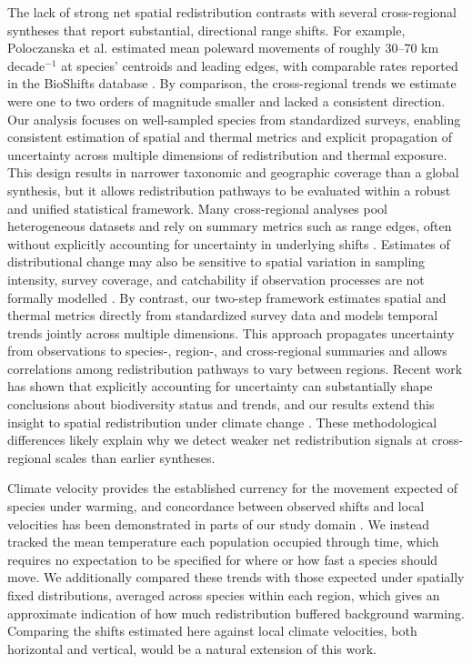 \documentclass[9pt,twocolumn,twoside]{pnas-new}
\begin{document}
The lack of strong net spatial redistribution contrasts with several cross-regional syntheses that report substantial, directional range shifts. For example, Poloczanska et al. \citep{poloczanska_global_2013} estimated mean poleward movements of roughly 30--70 km decade$^{-1}$ at species' centroids and leading edges, with comparable rates reported in the BioShifts database \citep{lenoir_species_2020}. By comparison, the cross-regional trends we estimate were one to two orders of magnitude smaller and lacked a consistent direction. Our analysis focuses on well-sampled species from standardized surveys, enabling consistent estimation of spatial and thermal metrics and explicit propagation of uncertainty across multiple dimensions of redistribution and thermal exposure. This design results in narrower taxonomic and geographic coverage than a global synthesis, but it allows redistribution pathways to be evaluated within a robust and unified statistical framework. Many cross-regional analyses pool heterogeneous datasets and rely on summary metrics such as range edges, often without explicitly accounting for uncertainty in underlying shifts \citep{brown_ecological_2016, lenoir_species_2020, dahms_temperature_2023}. Estimates of distributional change may also be sensitive to spatial variation in sampling intensity, survey coverage, and catchability if observation processes are not formally modelled \citep{thorson_model-based_2016}. By contrast, our two-step framework estimates spatial and thermal metrics directly from standardized survey data and models temporal trends jointly across multiple dimensions. This approach propagates uncertainty from observations to species-, region-, and cross-regional summaries and allows correlations among redistribution pathways to vary between regions. Recent work has shown that explicitly accounting for uncertainty can substantially shape conclusions about biodiversity status and trends, and our results extend this insight to spatial redistribution under climate change \citep{johnson_revealing_2024}. These methodological differences likely explain why we detect weaker net redistribution signals at cross-regional scales than earlier syntheses.

Climate velocity provides the established currency for the movement expected of species under warming, and concordance between observed shifts and local velocities has been demonstrated in parts of our study domain \citep{burrows_pace_2011, pinsky_marine_2013, englishContrastingClimateVelocity2022, gruenburgVerticalClimateVelocity2025}. We instead tracked the mean temperature each population occupied through time, which requires no expectation to be specified for where or how fast a species should move. We additionally compared these trends with those expected under spatially fixed distributions, averaged across species within each region, which gives an approximate indication of how much redistribution buffered background warming. Comparing the shifts estimated here against local climate velocities, both horizontal and vertical, would be a natural extension of this work.
\end{document}
